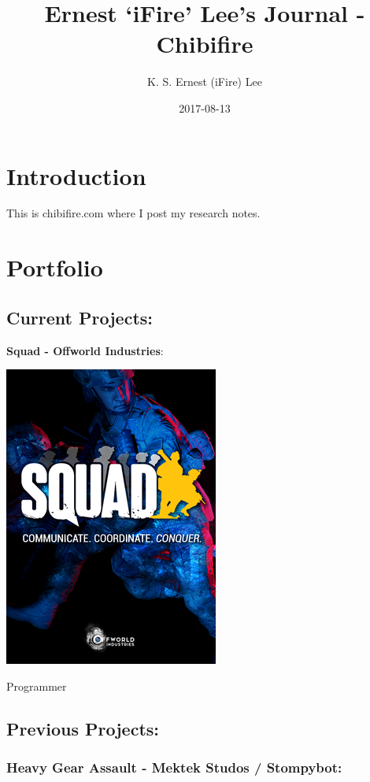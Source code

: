 \documentclass[]{book}
\title{Ernest `iFire' Lee's Journal - Chibifire}
\author{K. S. Ernest (iFire) Lee}
\date{2017-08-13}
\begin{document}
\maketitle

{
\setcounter{tocdepth}{1}
\tableofcontents
}
\chapter{Introduction}\label{intro}

This is chibifire.com where I post my research notes.

\chapter{Portfolio}\label{portfolio}

\section{Current Projects:}\label{current-projects}

\textbf{Squad - Offworld Industries}:

\includegraphics{Image/Squad_(videogame)_2016_frontcover.png}

Programmer

\section{Previous Projects:}\label{previous-projects}

\subsection{Heavy Gear Assault - Mektek Studos /
Stompybot:}\label{heavy-gear-assault---mektek-studos-stompybot}
\end{document}
